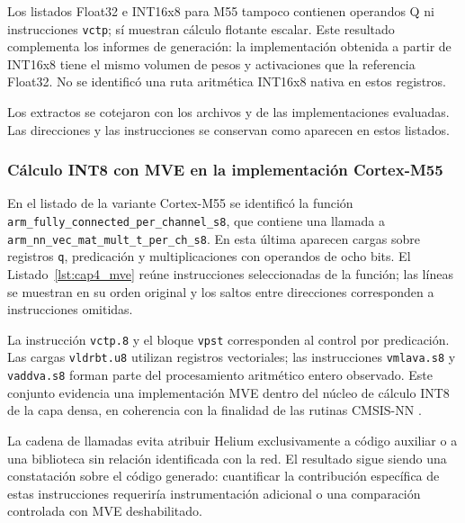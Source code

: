 Los listados Float32 e INT16x8 para M55 tampoco contienen operandos Q ni instrucciones \texttt{vctp}; sí muestran cálculo flotante escalar. Este resultado complementa los informes de generación: la implementación obtenida a partir de INT16x8 tiene el mismo volumen de pesos y activaciones que la referencia Float32. No se identificó una ruta aritmética INT16x8 nativa en estos registros.

Los extractos se cotejaron con los archivos  y  de las implementaciones evaluadas. Las direcciones y las instrucciones se conservan como aparecen en estos listados.

\subsubsection{Cálculo INT8 con MVE en la implementación Cortex-M55}
En el listado de la variante Cortex-M55 se identificó la función \texttt{arm\_\allowbreak fully\_\allowbreak connected\_\allowbreak per\_\allowbreak channel\_\allowbreak s8}, que contiene una llamada a \texttt{arm\_\allowbreak nn\_\allowbreak vec\_\allowbreak mat\_\allowbreak mult\_\allowbreak t\_\allowbreak per\_\allowbreak ch\_\allowbreak s8}. En esta última aparecen cargas sobre registros \texttt{q}, predicación y multiplicaciones con operandos de ocho bits. El Listado~\ref{lst:cap4_mve} reúne instrucciones seleccionadas de la función; las líneas se muestran en su orden original y los saltos entre direcciones corresponden a instrucciones omitidas.



\noindent\begin{minipage}{\linewidth}

\end{minipage}

La instrucción \texttt{vctp.8} y el bloque \texttt{vpst} corresponden al control por predicación. Las cargas \texttt{vldrbt.u8} utilizan registros vectoriales; las instrucciones \texttt{vmlava.s8} y \texttt{vaddva.s8} forman parte del procesamiento aritmético entero observado. Este conjunto evidencia una implementación MVE dentro del núcleo de cálculo INT8 de la capa densa, en coherencia con la finalidad de las rutinas CMSIS-NN \cite{cap4_cmsisnn}.

La cadena de llamadas evita atribuir Helium exclusivamente a código auxiliar o a una biblioteca sin relación identificada con la red. El resultado sigue siendo una constatación sobre el código generado: cuantificar la contribución específica de estas instrucciones requeriría instrumentación adicional o una comparación controlada con MVE deshabilitado.

